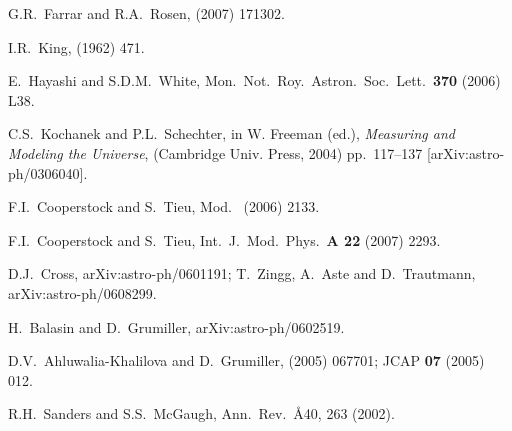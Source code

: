 \documentclass[12pt]{article}
\begin{document}
\begin{thebibliography}{66}
G.R.~Farrar and R.A.~Rosen,
 (2007) 171302. %

I.R.~King,
 (1962) 471.

E.~Hayashi and S.D.M.~White,
Mon.\ Not.\ Roy.\ Astron.\ Soc.\ Lett.\ {\bf370} (2006) L38.

C.S.~Kochanek and P.L.~Schechter,
in W. Freeman (ed.), {\it Measuring and Modeling the Universe},
(Cambridge Univ. Press, 2004) pp.\ 117--137
[arXiv:astro-ph/0306040].

F.I.~Cooperstock and S.~Tieu,
Mod.\  (2006) 2133.

F.I.~Cooperstock and S.~Tieu,
Int.\ J.\ Mod.\ Phys.\ {\bf A 22} (2007) 2293. %

D.J.~Cross,
arXiv:astro-ph/0601191;
T.~Zingg, A.~Aste and D.~Trautmann,
arXiv:astro-ph/0608299.

H.~Balasin and D.~Grumiller,
arXiv:astro-ph/0602519.

D.V.~Ahluwalia-Khalilova and D.~Grumiller,
 (2005) 067701; %
JCAP {\bf07} (2005) 012. %

R.H.~Sanders and S.S.~McGaugh,
Ann.\ Rev.\ \AA{40}, 263 (2002).


\end{thebibliography}
\end{document}
